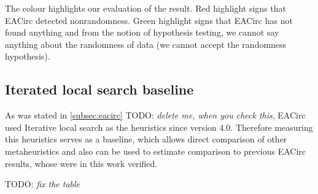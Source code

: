 \documentclass[
  print, %
  Table,   %
  nolof,     %
  nolot,     %
  11pt, %
  oneside  %
]{fithesis3}
\newcommand{\todo}[1]{TODO: \textit{#1}}
\begin{document}
The colour highlights our evaluation of the result. Red highlight signs that EACirc detected nonrandomness. Green highlight signs that EACirc has not found anything and from the notion of hypothesis testing, we cannot say anything about the randomness of data (we cannot accept the randomness hypothesis).

\subsection{Iterated local search baseline}
\label{subsec:res-ss-ils}

As was stated in \cref{subsec:eacirc} \todo{delete me, when you check this}, EACirc used Iterative local search as the heuristics since version 4.0. Therefore measuring this heuristics serves as a baseline, which allows direct comparison of other metaheuristics and also can be used to estimate comparison to previous EACirc results, whose were in this work verified.

\todo{fix the table}
\end{document}
